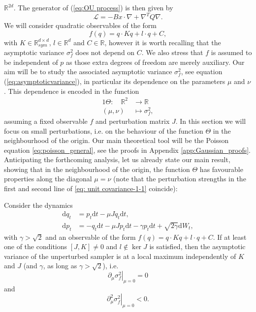 $\mathbb{R}^{2d}$. The generator of (\ref{eq:OU process}) is then
given by 
\begin{equation}
\mathcal{L}=-Bx\cdot\nabla+\nabla^{T}Q\nabla.\label{eq:OU generator}
\end{equation}
We will consider quadratic observables of the form 
\[
f(q)=q\cdot Kq+l\cdot q+C,
\]
with $K\in\mathbb{R}_{sym}^{d\times d}$, $l\in\mathbb{R}^{d}$ and
$C\in\mathbb{R}$, however it is worth recalling that the asymptotic variance $\sigma^2_f$ does not depend on $C$. We also stress that $f$ is assumed to be independent of
$p$ as those extra degrees of freedom are merely auxiliary. Our
aim will be to study the associated asymptotic variance $\sigma_{f}^{2}$, see equation (\ref{eq:asymptoticvariance}), in particular its
dependence on the parameters $\mu$ and $\nu$.  This dependence is encoded in the
function 
\begin{alignat*}{1}
\Theta:\quad\mathbb{R}^{2} & \rightarrow\mathbb{R}\\
(\mu,\nu) & \mapsto\sigma_{f}^{2},
\end{alignat*}
assuming a fixed observable $f$ and perturbation matrix $J$. In
this section we will focus on small perturbations, i.e. on the behaviour
of the function $\Theta$ in the neighbourhood of the origin. Our
main theoretical tool will be the Poisson equation \eqref{eq:poisson_general}, see the proofs in Appendix \ref{app:Gaussian_proofs}. Anticipating the forthcoming analysis, let us already state our main result, showing that in the neighbourhood of the origin, the function $\Theta$ has favourable properties along the diagonal $\mu=\nu$ (note that the perturbation strengths in the first and second line of \eqref{eq: unit covariance-1-1} coincide):

\begin{theorem}
	\label{cor:small pert unit var}Consider the dynamics 
\begin{align}
\mathrm{d}q_{t} & =p_{t}\mathrm{d}t-\mu Jq_{t}\mathrm{d}t,\nonumber \\
\mathrm{d}p_{t} & =-q_{t}\mathrm{d}t-\mu Jp_{t}\mathrm{d}t-\gamma p_{t}\mathrm{d}t+\sqrt{2\gamma}\mathrm{d}W_{t},\label{eq: unit covariance-1-1}
\end{align}
with $\gamma>\sqrt{2}$ and an observable of the form $f(q)=q\cdot Kq+l\cdot q+C$.
If at least one of the conditions $[J,K]\neq0$ and $l\notin\ker J$
is satisfied, then the asymptotic variance of the unperturbed sampler
is at a local maximum independently of $K$ and $J$ (and $\gamma$,
as long as $\gamma>\sqrt{2}$), i.e. 
\[
\left. \partial_{\mu}\sigma_{f}^{2} \right\rvert_{\mu =0}=0
\]
and 
\[
\left. \partial_{\mu}^{2}\sigma_{f}^{2}\right\rvert_{\mu = 0}<0.
\]
\end{theorem}



